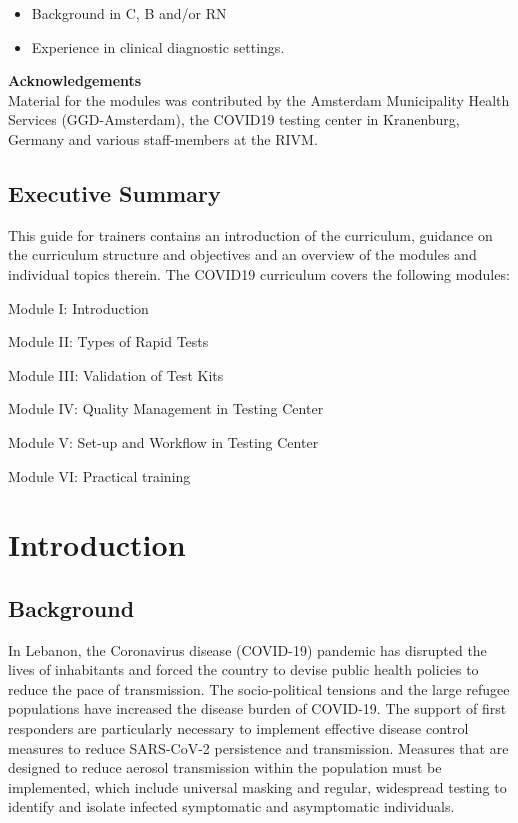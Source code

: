 \documentclass[
]{book}
\begin{document}
\begin{itemize}
\item
  Background in C, B and/or RN
\item
  Experience in clinical diagnostic settings.
\end{itemize}

\textbf{Acknowledgements\\
}Material for the modules was contributed by the Amsterdam Municipality
Health Services (GGD-Amsterdam), the COVID19 testing center in
Kranenburg, Germany and various staff-members at the RIVM.

\hypertarget{executive-summary}{%
\section{Executive Summary}\label{executive-summary}}

This guide for trainers contains an introduction of the curriculum,
guidance on the curriculum structure and objectives and an overview of
the modules and individual topics therein. The COVID19 curriculum covers
the following modules:

Module I: Introduction

Module II: Types of Rapid Tests

Module III: Validation of Test Kits

Module IV: Quality Management in Testing Center

Module V: Set-up and Workflow in Testing Center

Module VI: Practical training

\hypertarget{intro}{%
\chapter{Introduction}\label{intro}}

\hypertarget{background}{%
\section{Background}\label{background}}

In Lebanon, the Coronavirus disease (COVID-19) pandemic has disrupted
the lives of inhabitants and forced the country to devise public health
policies to reduce the pace of transmission. The socio-political
tensions and the large refugee populations have increased the disease
burden of COVID-19. The support of first responders are particularly
necessary to implement effective disease control measures to reduce
SARS-CoV-2 persistence and transmission. Measures that are designed to
reduce aerosol transmission within the population must be implemented,
which include universal masking and regular, widespread testing to
identify and isolate infected symptomatic and asymptomatic individuals.
\end{document}
